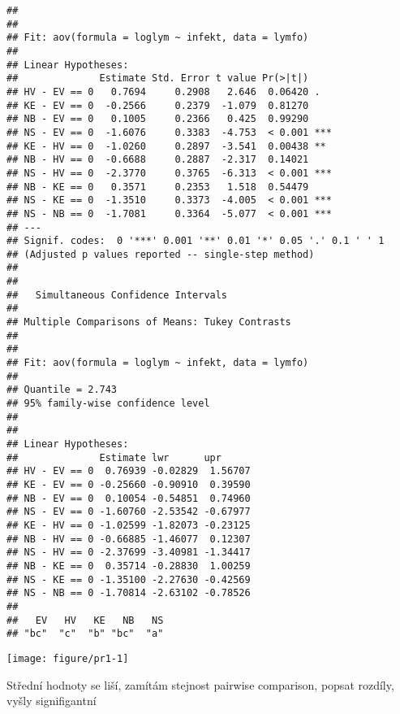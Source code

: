 \documentclass[twoside]{article}\usepackage[]{graphicx}\usepackage[]{color}
\makeatletter
\def\maxwidth{ %
  \ifdim\Gin@nat@width>\linewidth
    \linewidth
  \else
    \Gin@nat@width
  \fi
}
\newenvironment{kframe}{%
 \def\at@end@of@kframe{}%
 \ifinner\ifhmode%
  \def\at@end@of@kframe{\end{minipage}}%
  \begin{minipage}{\columnwidth}%
 \fi\fi%
 \def\FrameCommand##1{\hskip\@totalleftmargin \hskip-\fboxsep
 \colorbox{shadecolor}{##1}\hskip-\fboxsep
     \hskip-\linewidth \hskip-\@totalleftmargin \hskip\columnwidth}%
 \MakeFramed {\advance\hsize-\width
   \@totalleftmargin\z@ \linewidth\hsize
   \@setminipage}}%
 {\par\unskip\endMakeFramed%
 \at@end@of@kframe}
\newenvironment{knitrout}{}{} %
\makeatother
\begin{document}
\begin{knitrout}
\begin{kframe}
\begin{verbatim}
## 
## 
## Fit: aov(formula = loglym ~ infekt, data = lymfo)
## 
## Linear Hypotheses:
##              Estimate Std. Error t value Pr(>|t|)    
## HV - EV == 0   0.7694     0.2908   2.646  0.06420 .  
## KE - EV == 0  -0.2566     0.2379  -1.079  0.81270    
## NB - EV == 0   0.1005     0.2366   0.425  0.99290    
## NS - EV == 0  -1.6076     0.3383  -4.753  < 0.001 ***
## KE - HV == 0  -1.0260     0.2897  -3.541  0.00438 ** 
## NB - HV == 0  -0.6688     0.2887  -2.317  0.14021    
## NS - HV == 0  -2.3770     0.3765  -6.313  < 0.001 ***
## NB - KE == 0   0.3571     0.2353   1.518  0.54479    
## NS - KE == 0  -1.3510     0.3373  -4.005  < 0.001 ***
## NS - NB == 0  -1.7081     0.3364  -5.077  < 0.001 ***
## ---
## Signif. codes:  0 '***' 0.001 '**' 0.01 '*' 0.05 '.' 0.1 ' ' 1
## (Adjusted p values reported -- single-step method)
## 
## 
## 	 Simultaneous Confidence Intervals
## 
## Multiple Comparisons of Means: Tukey Contrasts
## 
## 
## Fit: aov(formula = loglym ~ infekt, data = lymfo)
## 
## Quantile = 2.743
## 95% family-wise confidence level
##  
## 
## Linear Hypotheses:
##              Estimate lwr      upr     
## HV - EV == 0  0.76939 -0.02829  1.56707
## KE - EV == 0 -0.25660 -0.90910  0.39590
## NB - EV == 0  0.10054 -0.54851  0.74960
## NS - EV == 0 -1.60760 -2.53542 -0.67977
## KE - HV == 0 -1.02599 -1.82073 -0.23125
## NB - HV == 0 -0.66885 -1.46077  0.12307
## NS - HV == 0 -2.37699 -3.40981 -1.34417
## NB - KE == 0  0.35714 -0.28830  1.00259
## NS - KE == 0 -1.35100 -2.27630 -0.42569
## NS - NB == 0 -1.70814 -2.63102 -0.78526
## 
##   EV   HV   KE   NB   NS 
## "bc"  "c"  "b" "bc"  "a"
\end{verbatim}
\end{kframe}
\texttt{[image: figure/pr1-1]} 

\end{knitrout}
Střední hodnoty se liší, zamítám stejnost
pairwise comparison, popsat rozdíly, vyšly signifigantní
\end{document}
